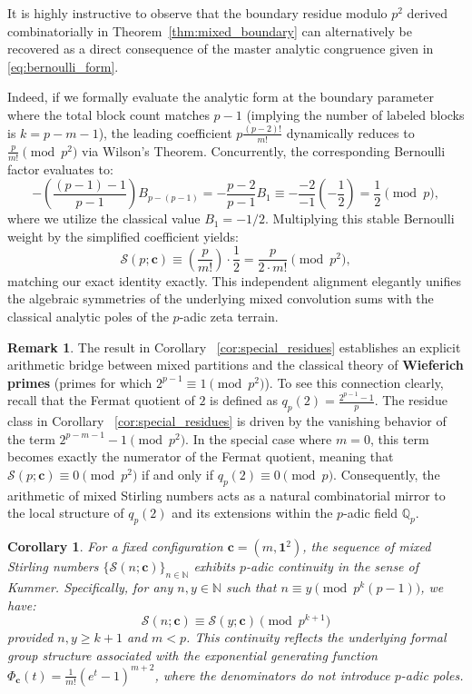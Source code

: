 \documentclass[12pt]{amsart}
\newtheorem{corollary}[theorem]{Corollary}
\theoremstyle{definition}
\newtheorem{remark}[theorem]{Remark}
\begin{document}
It is highly instructive to observe that the boundary residue modulo $p^2$ derived combinatorially in Theorem~\ref{thm:mixed_boundary} can alternatively be recovered as a direct consequence of the master analytic congruence given in \eqref{eq:bernoulli_form}. 

Indeed, if we formally evaluate the analytic form at the boundary parameter where the total block count matches $p-1$ (implying the number of labeled blocks is $k = p-m-1$), the leading coefficient $p \frac{(p-2)!}{m!}$ dynamically reduces to $\frac{p}{m!} \pmod{p^2}$ via Wilson's Theorem. Concurrently, the corresponding Bernoulli factor evaluates to:
\begin{equation*}
    -\left(\frac{(p-1)-1}{p-1}\right) B_{p-(p-1)} = -\frac{p-2}{p-1} B_1 \equiv -\frac{-2}{-1} \left( -\frac{1}{2} \right) = \frac{1}{2} \pmod p,
\end{equation*}
where we utilize the classical value $B_1 = -1/2$. Multiplying this stable Bernoulli weight by the simplified coefficient yields:
\begin{equation*}
    \mathcal{S}(p; \mathbf{c}) \equiv \left(\frac{p}{m!}\right) \cdot \frac{1}{2} = \frac{p}{2 \cdot m!} \pmod{p^2},
\end{equation*}
matching our exact identity exactly. This independent alignment elegantly unifies the algebraic symmetries of the underlying mixed convolution sums with the classical analytic poles of the $p$-adic zeta terrain.
\begin{remark}
The result in Corollary ~\ref{cor:special_residues} establishes an explicit arithmetic bridge between mixed partitions and the classical theory of \textbf{Wieferich primes} (primes for which $2^{p-1} \equiv 1 \pmod{p^2}$). To see this connection clearly, recall that the Fermat quotient of $2$ is defined as $q_p(2) = \frac{2^{p-1}-1}{p}$. The residue class in Corollary ~\ref{cor:special_residues} is driven by the vanishing behavior of the term $2^{p-m-1}-1 \pmod{p^2}$. In the special case where $m=0$, this term becomes exactly the numerator of the Fermat quotient, meaning that $\mathcal{S}(p; \mathbf{c}) \equiv 0 \pmod{p^2}$ if and only if $q_p(2) \equiv 0 \pmod p$. Consequently, the arithmetic of mixed Stirling numbers acts as a natural combinatorial mirror to the local structure of $q_p(2)$ and its extensions within the $p$-adic field $\mathbb{Q}_p$.
\end{remark}
\begin{corollary}
For a fixed configuration $\mathbf{c} = (m, \mathbf{1}^2)$, the sequence of mixed Stirling numbers $\{\mathcal{S}(n; \mathbf{c})\}_{n \in \mathbb{N}}$ exhibits $p$-adic continuity in the sense of Kummer. Specifically, for any $n, y \in \mathbb{N}$ such that $n \equiv y \pmod{p^k(p-1)}$, we have:
\begin{equation}
    \mathcal{S}(n; \mathbf{c}) \equiv \mathcal{S}(y; \mathbf{c}) \pmod{p^{k+1}}
\end{equation}
provided $n, y \ge k+1$ and $m < p$. This continuity reflects the underlying formal group structure associated with the exponential generating function $\Phi_{\mathbf{c}}(t) = \frac{1}{m!}(e^t-1)^{m+2}$, where the denominators do not introduce $p$-adic poles.
\end{corollary}
\end{document}
